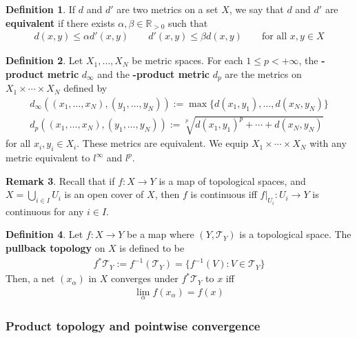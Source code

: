 \documentclass[12pt,b5paper,notitlepage]{article}
\theoremstyle{definition}
\newtheorem{df}{Definition}[section]
\newtheorem{rem}[df]{Remark}
\theoremstyle{plain}
\newcommand{\mc}{\mathcal}
\newcommand{\Rbb}{\mathbb R}
\numberwithin{equation}{section}
\begin{document}
\begin{df}
If $d$ and $d'$ are two metrics on a set $X$, we say that $d$ and $d'$ are \textbf{equivalent}  if there exists $\alpha,\beta\in\Rbb_{>0}$ such that
\begin{align*}
d(x,y)\leq \alpha d'(x,y)\qquad d'(x,y)\leq\beta d(x,y)\qquad\text{for all }x,y\in X
\end{align*}
\end{df}

\begin{df}\label{lb33}
Let $X_1,\dots,X_N$ be metric spaces. For each $1\leq p<+\infty$, the \textbf{-product metric} $d_\infty$  and the \textbf{-product metric}  $d_p$ are the metrics on $X_1\times\cdots\times X_N$ defined by
\begin{gather*}
d_\infty((x_1,\dots,x_N),(y_1,\dots,y_N)):=\max\{d(x_1,y_1),\dots,d(x_N,y_N)\}\\
d_p((x_1,\dots,x_N),(y_1,\dots,y_N)):=\sqrt[p]{d(x_1,y_1)^p+\cdots+d(x_N,y_N)}
\end{gather*}
for all $x_i,y_i\in X_i$. These metrics are equivalent. We equip $X_1\times\cdots\times X_N$ with any metric equivalent to $l^\infty$ and $l^p$.
\end{df}

\begin{rem}\label{lb34}
Recall that if $f:X\rightarrow Y$ is a map of topological spaces, and $X=\bigcup_{i\in I} U_i$ is an open cover of $X$, then $f$ is continuous iff $f|_{U_i}:U_i\rightarrow Y$ is continuous for any $i\in I$.
\end{rem}


\begin{df}
Let $f:X\rightarrow Y$ be a map where $(Y,\mc T_Y)$ is a topological space. The \textbf{pullback topology}  on $X$ is defined to be
\begin{align*}
f^*\mc T_Y:=f^{-1}(\mc T_Y)=\{f^{-1}(V):V\in\mc T_Y\}
\end{align*}
Then, a net $(x_\alpha)$ in $X$ converges under $f^*\mc T_Y$ to $x$ iff
\begin{align*}
\lim_\alpha f(x_\alpha)=f(x)
\end{align*}
\end{df}


\subsubsection{Product topology and pointwise convergence}
\end{document}
